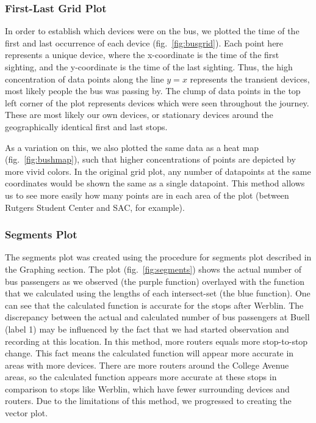 \subsubsection*{First-Last Grid Plot}

In order to establish which devices were on the bus, we plotted the time of the first and last occurrence of each device (fig.~\ref{fig:busgrid}).
Each point here represents a unique device, where the x-coordinate is the time of the first sighting, and the y-coordinate is the time of the last sighting.
Thus, the high concentration of data points along the line \(y=x\) represents the transient devices, most likely people the bus was passing by.
The clump of data points in the top left corner of the plot represents devices which were seen throughout the journey.
These are most likely our own devices, or stationary devices around the geographically identical first and last stops.

As a variation on this, we also plotted the same data as a heat map (fig.~\ref{fig:bushmap}), such that higher concentrations of points are depicted by more vivid colors.
In the original grid plot, any number of datapoints at the same coordinates would be shown the same as a single datapoint.
This method allows us to see more easily how many points are in each area of the plot (between Rutgers Student Center and SAC, for example).

\subsubsection*{Segments Plot}
The segments plot was created using the procedure for segments plot described in the Graphing section.
The plot (fig.~\ref{fig:segments}) shows the actual number of bus passengers as we observed (the purple function) overlayed with the function that we calculated using the lengths of each intersect-set (the blue function).
One can see that the calculated function is accurate for the stops after Werblin.
The discrepancy between the actual and calculated number of bus passengers at Buell (label 1) may be influenced by the fact that we had started observation and recording at this location. In this method, more routers equals more stop-to-stop change.
This fact means the calculated function will appear more accurate in areas with more devices.
There are more routers around the College Avenue areas, so the calculated function appears more accurate at these stops in comparison to stops like Werblin, which have fewer surrounding devices and routers.
Due to the limitations of this method, we progressed to creating the vector plot.

